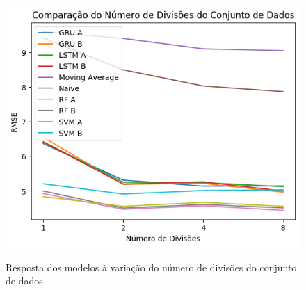 \begin{figure}[htbp]
    \centering
    \includegraphics[scale=0.9]{monography/img/comparisons/comparacao_do_numero_de_divisoes_do_conjunto_de_dados_rmse.png}
    \label{figure:res_split}
    \caption[Resposta dos modelos à variação do número de divisões do conjunto de dados]{Resposta dos modelos à variação do número de divisões do conjunto de dados}
\end{figure} 

